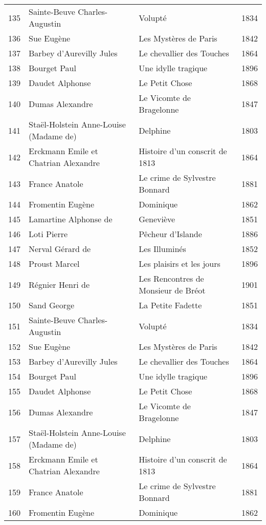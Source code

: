 \begin{center}
\begin{small}
\begin{longtable}{l l l l}
  135 & Sainte-Beuve Charles-Augustin & Volupté & 1834 \\
  136 & Sue Eugène & Les Mystères de Paris & 1842 \\
  137 & Barbey d'Aurevilly Jules & Le chevallier des Touches & 1864 \\
  138 & Bourget Paul & Une idylle tragique & 1896 \\
  139 & Daudet Alphonse & Le Petit Chose & 1868 \\
  140 & Dumas Alexandre & Le Vicomte de Bragelonne & 1847 \\
  141 & Staël-Holstein Anne-Louise (Madame de) & Delphine & 1803 \\
  142 & Erckmann Emile et Chatrian Alexandre & Histoire d’un conscrit de 1813 & 1864 \\
  143 & France Anatole & Le crime de Sylvestre Bonnard & 1881 \\
  144 & Fromentin Eugène & Dominique & 1862 \\
  145 & Lamartine Alphonse de & Geneviève & 1851 \\
  146 & Loti Pierre & Pêcheur d’Islande & 1886 \\
  147 & Nerval Gérard de & Les Illuminés & 1852 \\
  148 & Proust Marcel & Les plaisirs et les jours & 1896 \\
  149 & Régnier Henri de & Les Rencontres de Monsieur de Bréot & 1901 \\
  150 & Sand George & La Petite Fadette & 1851 \\
  151 & Sainte-Beuve Charles-Augustin & Volupté & 1834 \\
  152 & Sue Eugène & Les Mystères de Paris & 1842 \\
  153 & Barbey d'Aurevilly Jules & Le chevallier des Touches & 1864 \\
  154 & Bourget Paul & Une idylle tragique & 1896 \\
  155 & Daudet Alphonse & Le Petit Chose & 1868 \\
  156 & Dumas Alexandre & Le Vicomte de Bragelonne & 1847 \\
  157 & Staël-Holstein Anne-Louise (Madame de) & Delphine & 1803 \\
  158 & Erckmann Emile et Chatrian Alexandre & Histoire d’un conscrit de 1813 & 1864 \\
  159 & France Anatole & Le crime de Sylvestre Bonnard & 1881 \\
  160 & Fromentin Eugène & Dominique & 1862 \\

\end{longtable}
\end{small}
\end{center}
